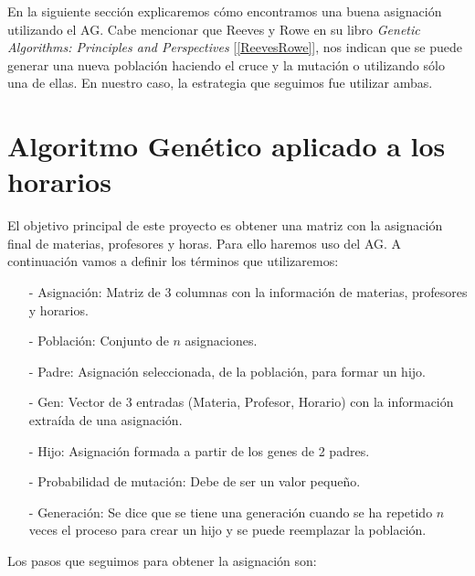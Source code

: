 En la siguiente sección explicaremos cómo encontramos una buena asignación utilizando el AG. Cabe mencionar que Reeves y Rowe en su libro \textit{Genetic Algorithms: Principles and Perspectives} [\ref{ReevesRowe}], nos indican que se puede generar una nueva población haciendo el cruce y la mutación o utilizando sólo una de ellas. En nuestro caso, la estrategia que seguimos fue utilizar ambas.


\section{Algoritmo Genético aplicado a los horarios}

El objetivo principal de este proyecto es obtener una matriz con la asignación final de materias, profesores y horas. Para ello haremos uso del AG. A continuación vamos a definir los términos que utilizaremos:

\begin{itemize}
\item[-] Asignación: Matriz de 3 columnas con la información de materias, profesores y horarios.

\item[-] Población: Conjunto de $n$ asignaciones.

\item[-] Padre: Asignación seleccionada, de la población, para formar un hijo.

\item[-] Gen: Vector de 3 entradas (Materia, Profesor, Horario) con la información extraída de una asignación.

\item[-] Hijo: Asignación formada a partir de los genes de 2 padres.

\item[-] Probabilidad de mutación: Debe de ser un valor pequeño. %

\item[-] Generación: Se dice que se tiene una generación cuando se ha repetido $n$ veces el proceso para crear un hijo y se puede reemplazar la población.
\end{itemize}

Los pasos que seguimos para obtener la asignación son:

